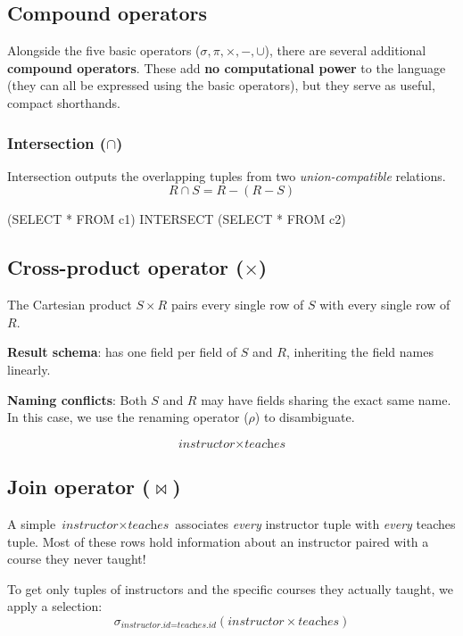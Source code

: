 \documentclass[../../dis.tex]{subfiles}
\begin{document}
\subsection{Compound operators}
Alongside the five basic operators ($\sigma, \pi, \times, -, \cup$), there are several additional \textbf{compound operators}. These add \textbf{no computational power} to the language (they can all be expressed using the basic operators), but they serve as useful, compact shorthands.

\subsubsection*{Intersection ($\cap$)}
Intersection outputs the overlapping tuples from two \emph{union-compatible} relations.
\[ R \cap S = R - (R - S) \]

\begin{sql}
    (SELECT * FROM c1)
    INTERSECT
    (SELECT * FROM c2)
\end{sql}

\subsection{Cross-product operator ($\times$)}
The Cartesian product $S \times R$ pairs every single row of $S$ with every single row of $R$.
\begin{dashlist}
    \item \textbf{Result schema}: has one field per field of $S$ and $R$, inheriting the field names linearly.
    \item \textbf{Naming conflicts}: Both $S$ and $R$ may have fields sharing the exact same name. In this case, we use the renaming operator ($\rho$) to disambiguate.
\end{dashlist}

\[ \textit{instructor} \times \textit{teaches} \]

\subsection{Join operator ($\bowtie$)}
A simple $\textit{instructor} \times \textit{teaches}$ associates \emph{every} instructor tuple with \emph{every} teaches tuple. Most of these rows hold information about an instructor paired with a course they never taught!

To get only tuples of instructors and the specific courses they actually taught, we apply a selection:
\[ \sigma_{\textit{instructor.id} = \textit{teaches.id}} (\textit{instructor} \times \textit{teaches}) \]
\end{document}
